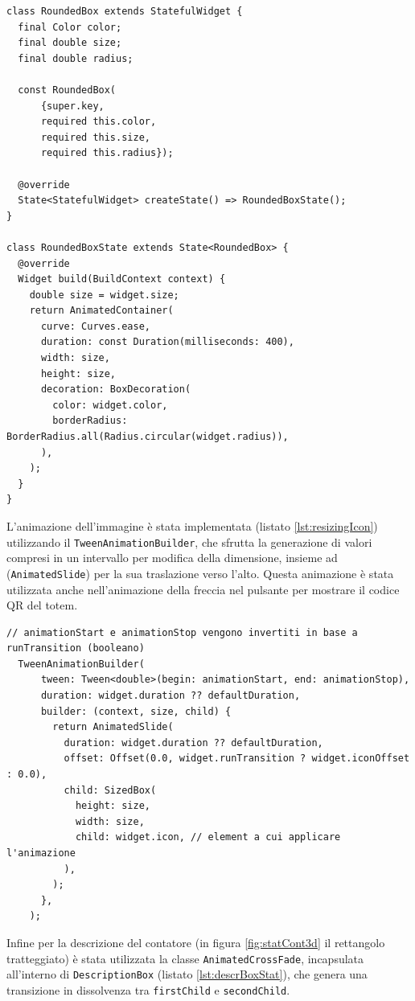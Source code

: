 \begin{lstlisting}[style=FlutterStyle, caption={Classe RoundedBox per usata nella creazione del contatore delle statistiche}, label={lst:roundedBox}]
class RoundedBox extends StatefulWidget {
  final Color color;
  final double size;
  final double radius;

  const RoundedBox(
      {super.key,
      required this.color,
      required this.size,
      required this.radius});

  @override
  State<StatefulWidget> createState() => RoundedBoxState();
}

class RoundedBoxState extends State<RoundedBox> {
  @override
  Widget build(BuildContext context) {
    double size = widget.size;
    return AnimatedContainer(
      curve: Curves.ease,
      duration: const Duration(milliseconds: 400),
      width: size,
      height: size,
      decoration: BoxDecoration(
        color: widget.color,
        borderRadius: BorderRadius.all(Radius.circular(widget.radius)),
      ),
    );
  }
}
\end{lstlisting}
%

L'animazione dell'immagine è stata implementata (listato \ref{lst:resizingIcon}) utilizzando il \texttt{TweenAnimationBuilder}, che sfrutta la generazione di valori compresi in un intervallo per modifica della dimensione, insieme ad (\texttt{AnimatedSlide}) per la sua traslazione verso l'alto. Questa animazione è stata utilizzata anche nell'animazione della freccia nel pulsante per mostrare il codice QR del totem.

\begin{lstlisting}[style=FlutterStyle, caption={}, label={lst:resizingIcon}]
  // animationStart e animationStop vengono invertiti in base a runTransition (booleano)
  TweenAnimationBuilder(
      tween: Tween<double>(begin: animationStart, end: animationStop),
      duration: widget.duration ?? defaultDuration,
      builder: (context, size, child) {
        return AnimatedSlide(
          duration: widget.duration ?? defaultDuration,
          offset: Offset(0.0, widget.runTransition ? widget.iconOffset : 0.0),
          child: SizedBox(
            height: size,
            width: size,
            child: widget.icon, // element a cui applicare l'animazione
          ),
        );
      },
    );
\end{lstlisting}

Infine per la descrizione del contatore (in figura \ref{fig:statCont3d} il rettangolo tratteggiato) è stata utilizzata la classe \texttt{AnimatedCrossFade}, incapsulata all'interno di \texttt{DescriptionBox} (listato \ref{lst:descrBoxStat}), che genera una transizione in dissolvenza tra \texttt{firstChild} e \texttt{secondChild}. 

